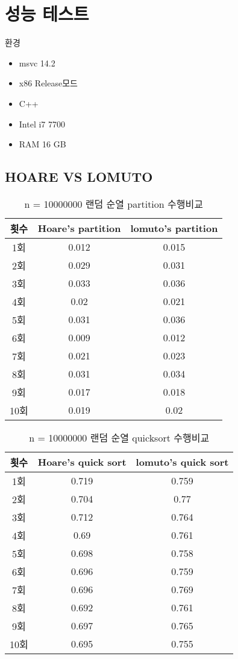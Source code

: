 \section{성능 테스트}

환경

\begin{itemize}
	\item msvc 14.2
	\item x86 Release모드
	\item C++
	\item Intel i7 7700
	\item RAM 16 GB
\end{itemize}


\newpage
\subsection{ HOARE VS LOMUTO }


\begin{table}[h!]
	\centering
	\begin{tabular}{|c|c|c|}
		\hline\hline
		횟수 & Hoare's partition & lomuto's partition \\ \hline
		1회 & 0.012 & 0.015 \\ \hline
		2회 & 0.029 & 0.031 \\ \hline
		3회 & 0.033 & 0.036 \\ \hline
		4회 & 0.02 & 0.021 \\ \hline
		5회 & 0.031 & 0.036 \\ \hline
		6회 & 0.009 & 0.012 \\ \hline
		7회 & 0.021 & 0.023 \\ \hline
		8회 & 0.031 & 0.034 \\ \hline
		9회 & 0.017 & 0.018 \\ \hline
		10회 & 0.019 & 0.02 \\ \hline
		\hline\hline
	\end{tabular}
	\caption{n = 10000000 랜덤 순열 partition 수행비교}
\end{table}

\begin{table}[h!]
	\centering
	\begin{tabular}{|c|c|c|}
		\hline\hline
		횟수 & Hoare's quick sort & lomuto's quick sort \\ \hline
		1회 & 0.719 & 0.759 \\ \hline
		2회 & 0.704 & 0.77 \\ \hline
		3회 & 0.712 & 0.764 \\ \hline
		4회 & 0.69 & 0.761 \\ \hline
		5회 & 0.698 & 0.758 \\ \hline
		6회 & 0.696 & 0.759 \\ \hline
		7회 & 0.696 & 0.769 \\ \hline
		8회 & 0.692 & 0.761 \\ \hline
		9회 & 0.697 & 0.765 \\ \hline
		10회 & 0.695 & 0.755 \\ \hline
		\hline\hline
	\end{tabular}
	\caption{n = 10000000 랜덤 순열 quicksort 수행비교}
\end{table}


